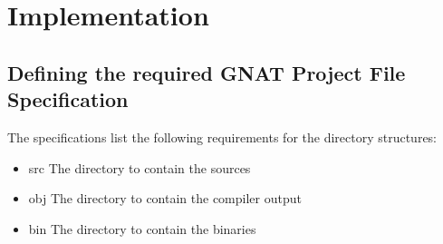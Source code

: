 \section{Implementation}

\subsection{Defining the required GNAT Project File Specification}
The specifications list the following requirements for the directory structures: 
\begin{itemize}
  \item{src} The directory to contain the sources
  \item{obj} The directory to contain the compiler output
  \item{bin} The directory to contain the binaries
\end{itemize}


